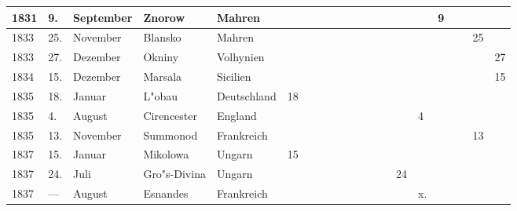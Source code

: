 \documentclass[a4paper, 8pt, oneside, polutonikogreek, german]{article}
\begin{document}
\begin{landscape}
\begin{table}[H]
\begin{longtable}{|p{5mm}|p{4mm}|p{13mm}|p{23mm}|p{16mm}|p{4mm}|p{6mm}|p{6mm}|p{6mm}|p{4mm}|p{5mm}|p{4mm}|p{5mm}|p{6mm}|p{5mm}|p{5mm}|p{5mm}|}
        1831 & 9. & September & Znorow & Mahren & ~ & ~ & ~ & ~ & ~ & ~ & ~ & ~ & 9 & ~ & ~ & ~ \\ \hline
        1833 & 25. & November & Blansko & Mahren & ~ & ~ & ~ & ~ & ~ & ~ & ~ & ~ & ~ & ~ & 25 & ~ \\ \hline
        1833 & 27. & Dezember & Okniny & Volhynien & ~ & ~ & ~ & ~ & ~ & ~ & ~ & ~ & ~ & ~ & ~ & 27 \\ \hline
        1834 & 15. & Dezember & Marsala & Sicilien & ~ & ~ & ~ & ~ & ~ & ~ & ~ & ~ & ~ & ~ & ~ & 15 \\ \hline
        1835 & 18. & Januar & L"obau & Deutschland & 18 & ~ & ~ & ~ & ~ & ~ & ~ & ~ & ~ & ~ & ~ & ~ \\ \hline
        1835 & 4. & August & Cirencester & England & ~ & ~ & ~ & ~ & ~ & ~ & ~ & 4 & ~ & ~ & ~ & ~ \\ \hline
        1835 & 13. & November & Summonod & Frankreich & ~ & ~ & ~ & ~ & ~ & ~ & ~ & ~ & ~ & ~ & 13 & ~ \\ \hline
        1837 & 15. & Januar & Mikolowa & Ungarn & 15 & ~ & ~ & ~ & ~ & ~ & ~ & ~ & ~ & ~ & ~ & ~ \\ \hline
        1837 & 24. & Juli & Gro"s-Divina & Ungarn & ~ & ~ & ~ & ~ & ~ & ~ & 24 & ~ & ~ & ~ & ~ & ~ \\ \hline
        1837 & --- & August & Esnandes & Frankreich & ~ & ~ & ~ & ~ & ~ & ~ & ~ & x. & ~ & ~ & ~ & ~ \\ \hline
    \end{longtable}
\end{table}
\vspace*{\fill}
\end{landscape}
\clearpage
\end{document}
